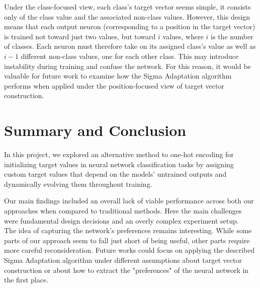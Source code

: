 \documentclass[12pt,fleqn,a4paper]{article}
\begin{document}
Under the class-focused view, each class's target vector seems simple, it consists only of the class value and the associated non-class values. However, this design means that each output neuron (corresponding to a position in the target vector) is trained not toward just two values, but toward $i$ values, where $i$ is the number of classes. Each neuron must therefore take on its assigned class's value as well as $i-1$ different non-class values, one for each other class. This may introduce instability during training and confuse the network. For this reason, it would be valuable for future work to examine how the Sigma Adaptation algorithm performs when applied under the position-focused view of target vector construction.


\section{Summary and Conclusion}
In this project, we explored an alternative method to one-hot encoding for initializing target values in neural network classification tasks by assigning custom target values that depend on the models' untrained outputs and dynamically evolving them throughout training.

Our main findings included an overall lack of viable performance across both our approaches when compared to traditional methods. Here the main challenges were fundamental design decisions and an overly complex experiment setup.\\

The idea of capturing the network's preferences remains interesting. While some parts of our approach seem to fall just short of being useful, other parts require more careful reconsideration. Future works could focus on applying the described Sigma Adaptation algorithm under different assumptions about target vector construction or about how to extract the "preferences" of the neural network in the first place.


\end{document}
